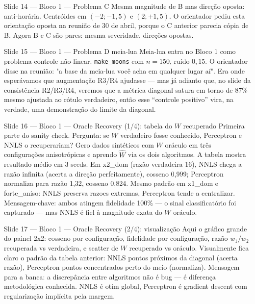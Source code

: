 \documentclass[aspectratio=169,10pt]{beamer}
\begin{document}
\begin{frame}{Slide 14 --- Bloco 1 --- Problema C}
\footnotesize
Mesma magnitude de B mas dire\c{c}\~ao oposta: anti-hor\'aria. Centr\'oides em $(-2; -1{,}5)$ e $(2; +1{,}5)$. O orientador pediu esta orienta\c{c}\~ao oposta na reuni\~ao de 30 de abril, porque o C anterior parecia c\'opia de B. Agora B e C s\~ao pares: mesma severidade, dire\c{c}\~oes opostas.
\end{frame}

\begin{frame}{Slide 15 --- Bloco 1 --- Problema D meia-lua}
\footnotesize
Meia-lua entra no Bloco 1 como problema-controle n\~ao-linear. \texttt{make\_moons} com $n=150$, ru\'ido $0{,}15$. O orientador disse na reuni\~ao: "a base da meia-lua voc\^e acha em qualquer lugar a\'i". Era onde esper\'avamos que augmenta\c{c}\~ao R3/R4 ajudasse --- mas j\'a adianto que, no slide da consist\^encia R2/R3/R4, veremos que a m\'etrica diagonal satura em torno de 87\% mesmo ajustada ao r\'otulo verdadeiro, ent\~ao esse ``controle positivo'' vira, na verdade, uma demonstra\c{c}\~ao do limite da diagonal.
\end{frame}

\begin{frame}{Slide 16 --- Bloco 1 --- Oracle Recovery (1/4): tabela do $W$ recuperado}
\footnotesize
Primeira parte do sanity check. Pergunta: se $W$ verdadeiro fosse conhecido, Perceptron e NNLS o recuperariam? Gero dados sint\'eticos com $W$ or\'aculo em tr\^es configura\c{c}\~oes anisotr\'opicas e aprendo $\hat W$ via os dois algoritmos. A tabela mostra resultado m\'edio em 3 seeds. Em x2\_dom (raz\~ao verdadeira 16), NNLS chega a raz\~ao infinita (acerta a dire\c{c}\~ao perfeitamente), cosseno 0,999; Perceptron normaliza para raz\~ao 1,32, cosseno 0,824. Mesmo padr\~ao em x1\_dom e forte\_aniso: NNLS preserva razoes extremas, Perceptron tende a centralizar. Mensagem-chave: ambos atingem fidelidade 100\% --- o sinal classificat\'orio foi capturado --- mas NNLS \'e fiel \`a magnitude exata do $W$ or\'aculo.
\end{frame}

\begin{frame}{Slide 17 --- Bloco 1 --- Oracle Recovery (2/4): visualiza\c{c}\~ao}
\footnotesize
Aqui o gr\'afico grande do painel 2x2: cosseno por configura\c{c}\~ao, fidelidade por configura\c{c}\~ao, raz\~ao $w_1/w_2$ recuperada vs verdadeira, e scatter de $W$ recuperado vs or\'aculo. Visualmente fica claro o padr\~ao da tabela anterior: NNLS pontos pr\'oximos da diagonal (acerta raz\~ao), Perceptron pontos concentrados perto do meio (normaliza). Mensagem para a banca: a discrep\^ancia entre algoritmos n\~ao \'e bug --- \'e diferen\c{c}a metodol\'ogica conhecida. NNLS \'e otim global, Perceptron \'e gradient descent com regulariza\c{c}\~ao impl\'icita pela margem.
\end{frame}
\end{document}
